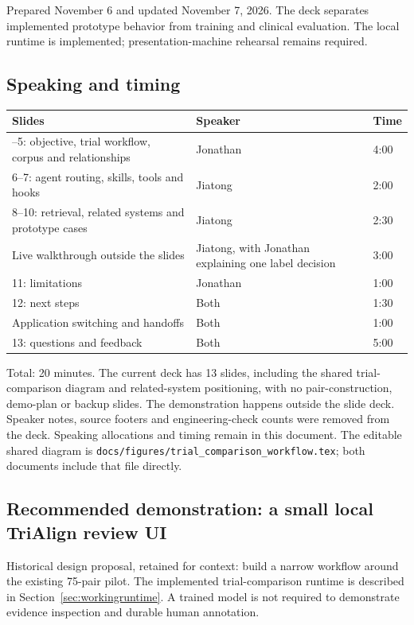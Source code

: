 \documentclass[10pt,letterpaper]{article}
\newcommand{\pathcode}[1]{\nolinkurl{#1}}
\begin{document}
Prepared November 6 and updated November 7, 2026. The deck separates implemented prototype behavior from training and clinical evaluation. The local runtime is implemented; presentation-machine rehearsal remains required.

\subsection{Speaking and timing}\label{demo-speaking-and-timing}

\begin{longtable}{L{.40\linewidth}L{.36\linewidth}L{.12\linewidth}}
\toprule\noalign{}
Slides & Speaker & Time \\
\midrule\noalign{}
\endhead
\bottomrule\noalign{}
--5: objective, trial workflow, corpus and relationships & Jonathan & 4:00 \\
6--7: agent routing, skills, tools and hooks & Jiatong & 2:00 \\
8--10: retrieval, related systems and prototype cases & Jiatong & 2:30 \\
Live walkthrough outside the slides & Jiatong, with Jonathan explaining one label decision & 3:00 \\
11: limitations & Jonathan & 1:00 \\
12: next steps & Both & 1:30 \\
Application switching and handoffs & Both & 1:00 \\
13: questions and feedback & Both & 5:00 \\
\end{longtable}

Total: 20 minutes. The current deck has 13 slides, including the shared trial-comparison diagram and related-system positioning, with no pair-construction, demo-plan or backup slides. The demonstration happens outside the slide deck. Speaker notes, source footers and engineering-check counts were removed from the deck. Speaking allocations and timing remain in this document. The editable shared diagram is \pathcode{docs/figures/trial_comparison_workflow.tex}; both documents include that file directly.

\subsection{Recommended demonstration: a small local TriAlign review UI}\label{demo-recommended-demonstration-a-small-local-trialign-review-ui}

Historical design proposal, retained for context: build a narrow workflow around the existing 75-pair pilot. The implemented trial-comparison runtime is described in Section~\ref{sec:workingruntime}. A trained model is not required to demonstrate evidence inspection and durable human annotation.
\end{document}
